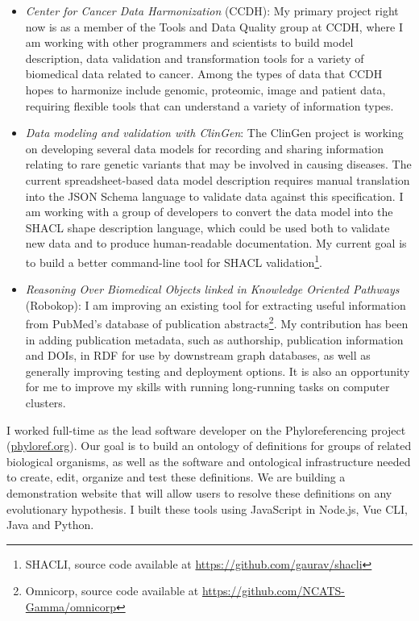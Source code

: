 \begin{itemize}

\item \textit{Center for Cancer Data Harmonization} (CCDH): My primary project right now is as a member of the Tools and Data Quality group at CCDH, where I am working with other programmers and scientists to build model description, data validation and transformation tools for a variety of biomedical data related to cancer. Among the types of data that CCDH hopes to harmonize include genomic, proteomic, image and patient data, requiring flexible tools that can understand a variety of information types.

\item \textit{Data modeling and validation with ClinGen}: The ClinGen project is working on developing several data models for recording and sharing information relating to rare genetic variants that may be involved in causing diseases. The current spreadsheet-based data model description requires manual translation into the JSON Schema language to validate data against this specification. I am working with a group of developers to convert the data model into the SHACL shape description language, which could be used both to validate new data and to produce human-readable documentation. My current goal is to build a better command-line tool for SHACL validation\footnote{SHACLI, source code available at \url{https://github.com/gaurav/shacli}}.

\item \textit{Reasoning Over Biomedical Objects linked in Knowledge Oriented Pathways} (Robokop): I am improving an existing tool for extracting useful information from PubMed's database of publication abstracts\footnote{Omnicorp, source code available at \url{https://github.com/NCATS-Gamma/omnicorp}}. My contribution has been in adding publication metadata, such as authorship, publication information and DOIs, in RDF for use by downstream graph databases, as well as generally improving testing and deployment options. It is also an opportunity for me to improve my skills with running long-running tasks on computer clusters.

\end{itemize}


I worked full-time as the lead software developer on the Phyloreferencing project (\href{http://phyloref.org}{phyloref.org}). Our goal is to build an ontology of definitions for groups of related biological organisms, as well as the software and ontological infrastructure needed to create, edit, organize and test these definitions. We are building a demonstration website that will allow users to resolve these definitions on any evolutionary hypothesis. I built these tools using JavaScript in Node.js, Vue CLI, Java and Python.

